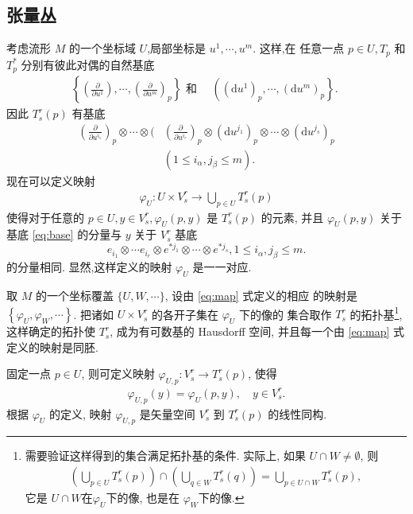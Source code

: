 \subsection{张量丛}
考虑流形 $M$ 的一个坐标域 $U$,局部坐标是 $u^1, \cdots, u^m$. 这样,在 任意一点 $p \in U, T_p$ 和 $T_p^*$ 分别有彼此对偶的自然基底
\begin{align*}
\left\{\left(\frac{\partial}{\partial u^1}\right), \cdots,\left(\frac{\partial}{\partial u^m}\right)_p\right\} \text { 和 } \quad\left(\left(\mathrm{d} u^1\right)_p, \cdots,\left(\mathrm{d} u^m\right)_p\right\} \text {. }
\end{align*}
因此 $T_s^r(p)$ 有基底
\begin{align}\label{eq:base}
\left(\frac{\partial}{\partial u^{i_1}}\right)_p \otimes \cdots \otimes( & \left(\frac{\partial}{\partial u^{i_r}}\right)_p \otimes\left(\mathrm{d} u^{j_1}\right)_p \otimes \cdots \otimes\left(\mathrm{d} u^{j_s}\right)_p \\
& \left(1 \leqslant i_\alpha, j_\beta \leqslant m\right) .
\end{align}
现在可以定义映射
\begin{align}\label{eq:map}
\varphi_U: U \times V_s^r \rightarrow \bigcup_{p \in U} T_s^r(p)
\end{align}
使得对于任意的 $p \in U, y \in V_s^r, \varphi_U(p, y)$ 是 $T_s^r(p)$ 的元素, 并且 $\varphi_U(p, y)$ 关于基底 \eqref{eq:base} 的分量与 $y$ 关于 $V^r_s$ 基底$$e_{i_1}\otimes \cdots e_{i_r}\otimes e^{*j_1}\otimes \cdots\otimes e^{*j_s}, 1\leqslant i_\alpha , j_\beta\leqslant m.$$
的分量相同. 显然,这样定义的映射 $\varphi_U$ 是一一对应.

取 $M$ 的一个坐标覆盖 $\{U, W, \cdots\}$, 设由 \eqref{eq:map} 式定义的相应 的映射是 $\left\{\varphi_U, \varphi_W, \cdots\right\}$. 把诸如 $U \times V^r_s$ 的各开子集在 $\varphi_U$ 下的像的
集合取作 $T_s^r$ 的拓扑基\footnote{需要验证这样得到的集合满足拓扑基的条件. 实际上, 如果 $U\cap W\neq \emptyset$, 则
\begin{align*}
\left(\bigcup_{p \in U} T_s^r(p)\right) \cap\left(\bigcup_{q \in W} T_s^r(q)\right)=\bigcup_{p \in U\cap W} T_s^r(p) ,
\end{align*}
它是 $U\cap W$在$\varphi_U$下的像, 也是在 $\varphi_W$下的像.}, 这样确定的拓扑使 $T_s^r$, 成为有可数基的 Hausdorff 空间, 并且每一个由 \eqref{eq:map} 式定义的映射是同胚. 

固定一点 $p \in U$, 则可定义映射 $\varphi_{U, p}: V_s^r \rightarrow T_s^r(p)$, 使得
\begin{align*}
\varphi_{U, p}(y)=\varphi_U(p, y), \quad y \in V_s^r .
\end{align*}
根据 $\varphi_U$ 的定义, 映射 $\varphi_{U, p}$ 是矢量空间 $V_s^r$ 到 $T_s^r(p)$ 的线性同构.


